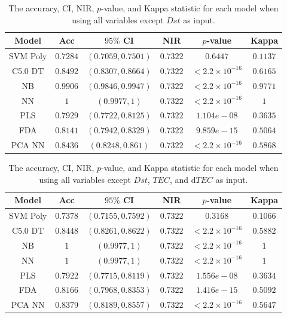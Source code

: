 \documentclass[sn-mathphys-num]{sn-jnl}%
\begin{document}
\begin{table}[!ht]
    \centering
    \caption{The accuracy, CI, NIR, $p$-value, and Kappa statistic for each model when using all variables except $Dst$ as input.}
	\label{tab:stats:reverse:no_DisturbanceStormTime}
	\begin{tabular}{|c|c|c|c|c|c|}
		\hline
		Model & Acc & $95\%$ CI & NIR & $p$-value & Kappa \\ \hline
		SVM Poly & $0.7284$ & $(0.7059, 0.7501)$ & $0.7322$ & $0.6447$ & $0.1137$ \\ \hline
		C5.0 DT & $0.8492$ & $(0.8307, 0.8664)$ & $0.7322$ & $< 2.2 \times {10}^{-16}$ & $0.6165$ \\ \hline
		NB & $0.9906$ & $(0.9846, 0.9947)$ & $0.7322$ & $< 2.2 \times {10}^{-16}$ & $0.9771$ \\ \hline
		NN & $1$ & $(0.9977, 1)$ & $0.7322$ & $< 2.2 \times {10}^{-16}$ & $1$ \\ \hline
		PLS & $0.7929$ & $(0.7722, 0.8125)$ & $0.7322$ & $1.104e-08$ & $0.3635$ \\ \hline
		FDA & $0.8141$ & $(0.7942, 0.8329)$ & $0.7322$ & $9.859e-15$ & $0.5064$ \\ \hline
		PCA NN & $0.8436$ & $(0.8248, 0.861)$ & $0.7322$ & $< 2.2 \times {10}^{-16}$ & $0.5868$ \\ \hline
	\end{tabular}
\end{table}

\begin{table}[!ht]
    \centering
    \caption{The accuracy, CI, NIR, $p$-value, and Kappa statistic for each model when using all variables except $Dst$, $TEC$, and d$TEC$ as input.}
	\label{tab:stats:reverse:no_TotalElectronContent}
	\begin{tabular}{|c|c|c|c|c|c|}
		\hline
		Model & Acc & $95\%$ CI & NIR & $p$-value & Kappa \\ \hline
		SVM Poly & $0.7378$ & $(0.7155, 0.7592)$ & $0.7322$ & $0.3168$ & $0.1066$ \\ \hline
		C5.0 DT & $0.8448$ & $(0.8261, 0.8622)$ & $0.7322$ & $< 2.2 \times {10}^{-16}$ & $0.5882$ \\ \hline
		NB & $1$ & $(0.9977, 1)$ & $0.7322$ & $< 2.2 \times {10}^{-16}$ & $1$ \\ \hline
		NN & $1$ & $(0.9977, 1)$ & $0.7322$ & $< 2.2 \times {10}^{-16}$ & $1$ \\ \hline
		PLS & $0.7922$ & $(0.7715, 0.8119)$ & $0.7322$ & $1.556e-08$ & $0.3634$ \\ \hline
		FDA & $0.8166$ & $(0.7968, 0.8353)$ & $0.7322$ & $1.416e-15$ & $0.5092$ \\ \hline
		PCA NN & $0.8379$ & $(0.8189, 0.8557)$ & $0.7322$ & $< 2.2 \times {10}^{-16}$ & $0.5647$ \\ \hline
	\end{tabular}
\end{table}
\end{document}
